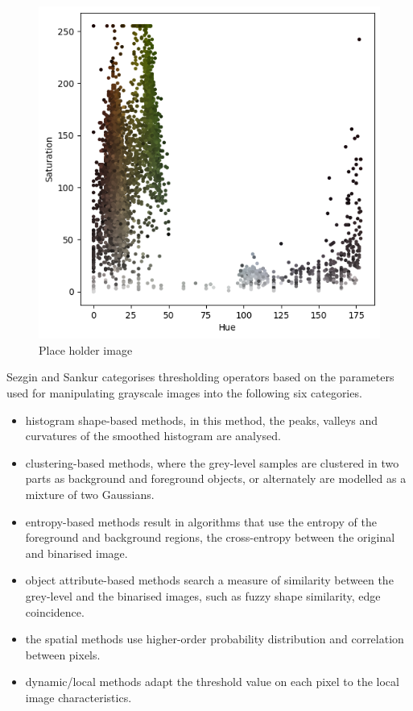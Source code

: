 \begin{figure}[!htb]
    \centering
    \includegraphics[scale=0.9, keepaspectratio]{Figures/download.png}
    \caption{Place holder image}
    \label{fig:my_place}
\end{figure} 

Sezgin and Sankur \cite{sezgin2004survey} categorises thresholding operators based on the parameters used for manipulating grayscale images into the following six categories.

\begin{itemize}
\item histogram shape-based methods, in this method, the peaks, valleys and curvatures of the smoothed histogram are analysed.
\item clustering-based methods, where the grey-level samples are clustered in two parts as background and foreground objects, or alternately are modelled as a mixture of two Gaussians.
\item entropy-based methods result in algorithms that use the entropy of the foreground and background regions, the cross-entropy between the original and binarised image.
\item object attribute-based methods search a measure of similarity between the grey-level and the binarised images, such as fuzzy shape similarity, edge coincidence.
\item the spatial methods use higher-order probability distribution and correlation between pixels.
\item dynamic/local methods adapt the threshold value on each pixel to the local image characteristics.

\end{itemize}

